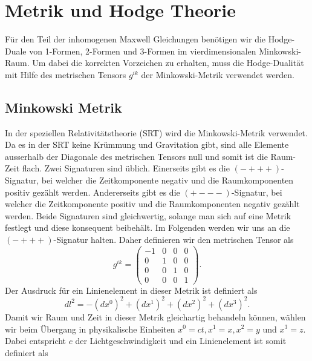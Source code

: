 %
%
%
%
\section{Metrik und Hodge Theorie 
\label{maxwell:section:teil1}}

Für den Teil der inhomogenen Maxwell Gleichungen benötigen wir die Hodge-Duale von 1-Formen, 2-Formen und 3-Formen im vierdimensionalen Minkowski-Raum.
Um dabei die korrekten Vorzeichen zu erhalten, muss die Hodge-Dualität mit Hilfe des metrischen Tensors $g^{ik}$  der Minkowski-Metrik verwendet werden.

\subsection{Minkowski Metrik}
In der speziellen Relativitätstheorie (SRT) wird die Minkowski-Metrik verwendet.
Da es in der SRT keine Krümmung und Gravitation gibt, sind alle Elemente ausserhalb der Diagonale des metrischen Tensors null und somit ist die Raum-Zeit flach.
Zwei Signaturen sind üblich.
Einerseits gibt es die $(-+++)$-Signatur, bei welcher die Zeitkomponente negativ und die Raumkomponenten positiv gezählt werden.
Andererseits gibt es die $(+---)$-Signatur, bei welcher die Zeitkomponente positiv und die Raumkomponenten negativ gezählt werden.
Beide Signaturen sind gleichwertig, solange man sich auf eine Metrik festlegt und diese konsequent beibehält.
Im Folgenden werden wir uns an die $(-+++)$-Signatur halten.
Daher definieren wir den metrischen Tensor als
\begin{equation}
	g^{ik} = \begin{pmatrix}
		-1 & 0 & 0 & 0 \\ 0 & 1 & 0 & 0 \\ 0 & 0 & 1 & 0 \\ 0 & 0 & 0 & 1 
	\end{pmatrix}.
	\label{maxwell:section:teil1:metrik}
\end{equation}
Der Ausdruck für ein Linienelement in dieser Metrik ist definiert als
\begin{equation}
	dl^2 = -(dx^0)^2 +(dx^1)^2+(dx^2)^2+(dx^3)^2.
\end{equation}
Damit wir Raum und Zeit in dieser Metrik gleichartig behandeln können, wählen wir beim Übergang in physikalische Einheiten $x^0 = ct, x^1 = x, x^2 = y$ und $x^3 = z$. Dabei entspricht $c$ der Lichtgeschwindigkeit und ein Linienelement ist somit definiert als
